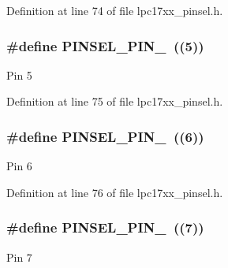 Definition at line 74 of file lpc17xx\+\_\+pinsel.\+h.

\subsubsection[{\texorpdfstring{P\+I\+N\+S\+E\+L\+\_\+\+P\+I\+N\+\_\+5}{PINSEL_PIN_5}}]{\setlength{\rightskip}{0pt plus 5cm}\#define P\+I\+N\+S\+E\+L\+\_\+\+P\+I\+N\+\_~((5))}\hypertarget{group___p_i_n_s_e_l___public___macros_ga5979b18582a24b9cb7d34683177f2e2c}{}\label{group___p_i_n_s_e_l___public___macros_ga5979b18582a24b9cb7d34683177f2e2c}
Pin 5 

Definition at line 75 of file lpc17xx\+\_\+pinsel.\+h.

\subsubsection[{\texorpdfstring{P\+I\+N\+S\+E\+L\+\_\+\+P\+I\+N\+\_\+6}{PINSEL_PIN_6}}]{\setlength{\rightskip}{0pt plus 5cm}\#define P\+I\+N\+S\+E\+L\+\_\+\+P\+I\+N\+\_~((6))}\hypertarget{group___p_i_n_s_e_l___public___macros_gab60e9a23a646c4f8525b7731a14e98b9}{}\label{group___p_i_n_s_e_l___public___macros_gab60e9a23a646c4f8525b7731a14e98b9}
Pin 6 

Definition at line 76 of file lpc17xx\+\_\+pinsel.\+h.

\subsubsection[{\texorpdfstring{P\+I\+N\+S\+E\+L\+\_\+\+P\+I\+N\+\_\+7}{PINSEL_PIN_7}}]{\setlength{\rightskip}{0pt plus 5cm}\#define P\+I\+N\+S\+E\+L\+\_\+\+P\+I\+N\+\_~((7))}\hypertarget{group___p_i_n_s_e_l___public___macros_gafeb1600b848f4638595c4e9df38189cc}{}\label{group___p_i_n_s_e_l___public___macros_gafeb1600b848f4638595c4e9df38189cc}
Pin 7 

